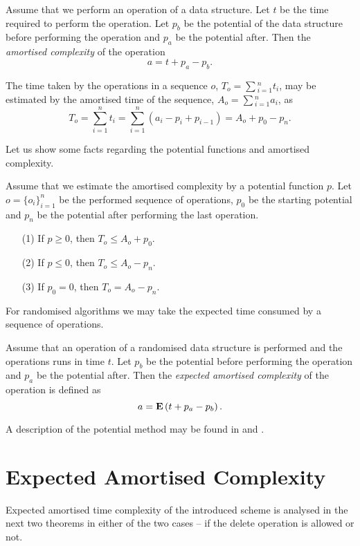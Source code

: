 \begin{definition}
Assume that we perform an operation of a data structure. Let $t$ be the time required to perform the operation. Let $p_b$ be the potential of the data structure before performing the operation and $p_a$ be the potential after. Then the \emph{amortised complexity} of the operation \[ a = t + p_a - p_b \text{.} \]
\end{definition}

The time taken by the operations in a sequence $o$, $T_o = \sum\displaystyle_{i = 1}^{n} t_i$, may be estimated by the amortised time of the sequence, $A_o = \sum\displaystyle_{i = 1}^{n} a_i$, as
\[
	T_o = \displaystyle\sum_{i = 1}^{n} t_i = \displaystyle\sum_{i = 1}^{n} (a_i - p_i + p_{i - 1}) = A_o + p_0 - p_n \text{.}
\]

Let us show some facts regarding the potential functions and amortised complexity.
\begin{claim}
\label{claim-amortised-complexity}
Assume that we estimate the amortised complexity by a potential function $p$. Let $o = \{o_i\}_{i = 1}^{n}$ be the performed sequence of operations, $p_0$ be the starting potential and $p_n$ be the potential after performing the last operation.
\begin{enumerate}
\item [(1)] If $p \geq 0$, then $T_o \leq A_o + p_0$.
\item [(2)] If $p \leq 0$, then $T_o \leq A_o - p_n$.
\item [(3)] If $p_0 = 0$, then $T_o = A_o - p_n$.
\end{enumerate}
\end{claim}

For randomised algorithms we may take the expected time consumed by a sequence of operations.

\begin{definition}
Assume that an operation of a randomised data structure is performed and the operations runs in time $t$. Let $p_b$ be the potential before performing the operation and $p_a$ be the potential after. Then the \emph{expected amortised complexity} of the operation is defined as \[ a = \mathbf{E}\left(t + p_a - p_{b}\right) \text{.} \]
\end{definition}

A description of the potential method may be found in \cite{VK-skripta} and \cite{DBLP:books/sp/MehlhornS2008}.

\section{Expected Amortised Complexity}
\label{section-expected-amortised-complexity}
Expected amortised time complexity of the introduced scheme is analysed in the next two theorems in either of the two cases -- if the delete operation is allowed or not.

